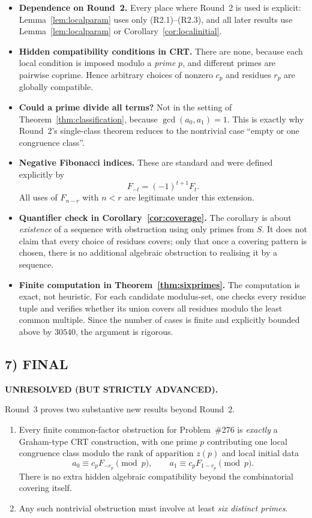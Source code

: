 \begin{itemize}
\item \textbf{Dependence on Round~2.} Every place where Round~2 is used is explicit: Lemma~\ref{lem:localparam} uses only (R2.1)--(R2.3), and all later results use Lemma~\ref{lem:localparam} or Corollary~\ref{cor:localinitial}.

\item \textbf{Hidden compatibility conditions in CRT.} There are none, because each local condition is imposed modulo a \emph{prime} $p$, and different primes are pairwise coprime. Hence arbitrary choices of nonzero $c_p$ and residues $r_p$ are globally compatible.

\item \textbf{Could a prime divide all terms?} Not in the setting of Theorem~\ref{thm:classification}, because $\gcd(a_0,a_1)=1$. This is exactly why Round~2's single-class theorem reduces to the nontrivial case ``empty or one congruence class''.

\item \textbf{Negative Fibonacci indices.} These are standard and were defined explicitly by
\[
F_{-t}=(-1)^{t+1}F_t.
\]
All uses of $F_{n-r}$ with $n<r$ are legitimate under this extension.

\item \textbf{Quantifier check in Corollary~\ref{cor:coverage}.} The corollary is about \emph{existence} of a sequence with obstruction using only primes from $S$. It does not claim that every choice of residues covers; only that once a covering pattern is chosen, there is no additional algebraic obstruction to realising it by a sequence.

\item \textbf{Finite computation in Theorem~\ref{thm:sixprimes}.} The computation is exact, not heuristic. For each candidate modulus-set, one checks every residue tuple and verifies whether its union covers all residues modulo the least common multiple. Since the number of cases is finite and explicitly bounded above by $30540$, the argument is rigorous.
\end{itemize}

\subsection*{7) FINAL}
\textbf{UNRESOLVED (BUT STRICTLY ADVANCED).}

Round~3 proves two substantive new results beyond Round~2.

\begin{enumerate}
\item Every finite common-factor obstruction for Problem~\#276 is \emph{exactly} a Graham-type CRT construction, with one prime $p$ contributing one local congruence class modulo the rank of apparition $z(p)$ and local initial data
\[
a_0\equiv c_pF_{-r_p}\pmod p,
\qquad
 a_1\equiv c_pF_{1-r_p}\pmod p.
\]
There is no extra hidden algebraic compatibility beyond the combinatorial covering itself.

\item Any such nontrivial obstruction must involve at least \emph{six distinct primes}.
\end{enumerate}

